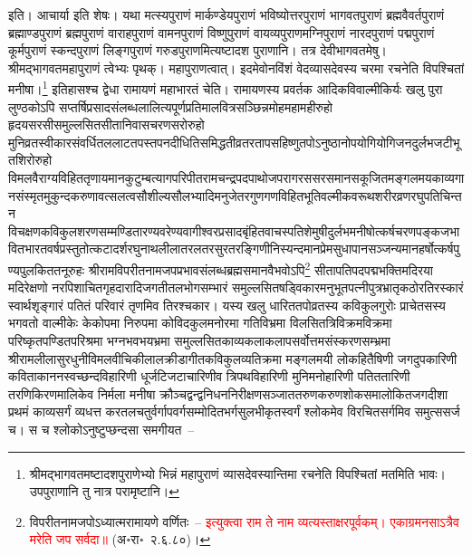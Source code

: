 \begin{sloppypar}\justifying\noindent इति। आचार्या इति शेषः। यथा मत्स्य\-पुराणं मार्कण्डेय\-पुराणं भविष्योत्तर\-पुराणं भागवत\-पुराणं ब्रह्म\-वैवर्त\-पुराणं ब्रह्माण्ड\-पुराणं ब्रह्म\-पुराणं वाराह\-पुराणं वामन\-पुराणं विष्णु\-पुराणं वायव्य\-पुराणमग्नि\-पुराणं नारद\-पुराणं पद्म\-पुराणं कूर्म\-पुराणं स्कन्द\-पुराणं लिङ्ग\-पुराणं गरुड\-पुराणमित्यष्टादश पुराणानि। तत्र देवी\-भागवतमेषु। श्रीमद्भागवत\-महा\-पुराणं त्वेभ्यः पृथक्। महा\-पुराणत्वात्। इदमेवोन\-विंशं वेद\-व्यास\-देवस्य चरमा रचनेति विपश्चितां मनीषा।\footnote{श्रीमद्भागवतमष्टादश\-पुराणेभ्यो भिन्नं महापुराणं व्यासदेवस्यान्तिमा रचनेति विपश्चितां मतमिति भावः। उपपुराणानि तु नात्र परामृष्टानि।} इतिहासश्च द्वेधा रामायणं महाभारतं चेति। रामायणस्य प्रवर्तक आदि\-कवि\-वाल्मीकिर्यः खलु पुरा लुण्ठकोऽपि सप्तर्षि\-प्रसाद\-संलब्ध\-लालित्य\-पूर्ण\-प्रतिमा\-लवित्र\-सञ्छिन्न\-मोह\-महा\-महीरुहो हृदय\-सरसी\-समुल्लसित\-सीता\-निवास\-चरण\-सरोरुहो मुनि\-व्रत\-स्वीकार\-संवर्धित\-ललाट\-तपस्तपन\-दीधिति\-समिद्ध\-तीव्र\-तर\-ताप\-सहिष्णु\-तपोऽनुष्ठानोप\-योगि\-योगि\-जन\-दुर्लभ\-जटी\-भूत\-शिरोरुहो 
विमल\-वैराग्य\-विहित\-तृणायमान\-कुटुम्ब\-त्याग\-परिपीत\-रामचन्द्र\-पद\-पाथोज\-पराग\-रस\-सरस\-मानस\-कूजित\-मङ्गलमय\-काव्य\-गान\-संस्मृत\-मुकुन्द\-करुणा\-वत्सलत्व\-सौशील्य\-सौलभ्यादि\-मनुजेतर\-गुण\-गण\-विहित\-भूति\-वल्मीक\-वरूथ\-शरीर\-व्रण\-रघुपति\-चिन्तन\-
विचक्षण\-कविकुल\-शरण\-सम्मण्डितारण्य\-वरेण्य\-वागीश्वर\-प्रसाद\-बृंहित\-वाचस्पति\-शेमुषी\-दुर्लभ\-मनीषोत्कर्ष\-चरण\-पङ्कजभावित\-भारत\-वर्ष\-प्रस्तुतोत्कटादर्श\-रघुनाथ\-लीला\-तरलतर\-सुर\-तरङ्गिणी\-निस्यन्दमान\-प्रेम\-सुधापान\-सञ्जन्यमान\-हर्षोत्कर्ष\-पुण्य\-पुलकित\-तनूरुहः श्रीराम\-विपरीत\-नाम\-जप\-प्रभाव\-संलब्ध\-ब्रह्म\-समान\-वैभवोऽपि\footnote{विपरीत\-नाम\-जपोऽध्यात्म\-रामायणे वर्णितः~– \textcolor{red}{इत्युक्त्वा राम ते नाम व्यत्यस्ताक्षरपूर्वकम्। एकाग्रमनसाऽत्रैव मरेति जप सर्वदा॥} (अ॰रा॰~२.६.८०)।} सीता\-पति\-पद\-पद्म\-भक्ति\-मदिरया मदिरेक्षणो नरपिशाचित\-गृहदारादि\-जगतीतल\-भोग\-सम्भारं समुल्लसित\-षड्विकारमनुभूत\-पत्नी\-पुत्र\-भ्रातृ\-कठोर\-तिरस्कारं स्वार्थ\-शृङ्गारं पतितं परिवारं तृणमिव तिरश्चकार। यस्य खलु 
धारित\-तपोव्रतस्य कवि\-कुल\-गुरोः प्राचेतसस्य भगवतो वाल्मीकेः केकोपमा निरुपमा कोविद\-कुल\-मनोरमा गति\-विभ्रमा विलसित\-त्रिविक्रम\-विक्रमा परिष्कृत\-पण्डित\-परिश्रमा भग्नभव\-भयभ्रमा समुल्लसित\-काव्यकला\-कलाप\-सर्वोत्तम\-संस्करण\-सम्भ्रमा श्री\-रामलीला\-सुरधुनी\-विमल\-वीचि\-कीलाल\-क्रीडा\-गीत\-कवि\-कुल\-व्यतिक्रमा मङ्गल\-मयी लोक\-हितैषिणी जगदुप\-कारिणी कविता\-कानन\-स्वच्छन्द\-विहारिणी धूर्जटि\-जटा\-चारिणीव त्रिपथ\-विहारिणी मुनि\-मनोहारिणी पतित\-तारिणी तरणि\-किरण\-मालिकेव निर्मला मनीषा क्रौञ्च\-द्वन्द्व\-निधन\-निरीक्षण\-सञ्जात\-तरुण\-करुण\-शोक\-समालोकित\-जगदीशा प्रथमं काव्य\-सर्गं व्यधत्त करतल\-चतुर्वर्गाप\-वर्ग\-सम्मोदित\-भर्ग\-सुलभीकृत\-स्वर्गं श्लोकमेव विरचित\-सर्गमिव समुत्ससर्ज च। स च श्लोकोऽनुष्टुप्छन्दसा समगीयत~–\end{sloppypar}
